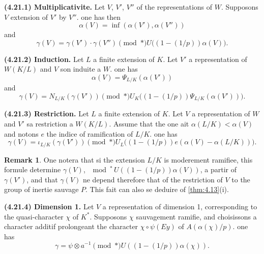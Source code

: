 \documentclass[12pt,a4paper]{article}
\theoremstyle{plain}
\theoremstyle{definition}
\newtheorem{remark}[theorem]{Remark}
\theoremstyle{remark}
\begin{document}
\textbf{(4.21.1) Multiplicativite.} Let $V$, $V'$, $V''$ of the representations of $W$. Supposons $V$ extension of $V'$ by $V''$. one has then
\[
\alpha(V) = \inf(\alpha(V'), \alpha(V''))
\]
and
\[
\gamma(V) = \gamma(V') \cdot \gamma(V'') \pmod{*} U\bigl((1-(1/p))\alpha(V)\bigr).
\]

\textbf{(4.21.2) Induction.} Let $L$ a finite extension of $K$. Let $V'$ a representation of $W(K/L)$ and $V$ son induite a $W$. one has
\[
\alpha(V) = \Psi_{L/K}(\alpha(V'))
\]
and
\[
\gamma(V) = N_{L/K}(\gamma(V')) \pmod{*} U_K\bigl((1-(1/p))\Psi_{L/K}(\alpha(V'))\bigr).
\]

\textbf{(4.21.3) Restriction.} Let $L$ a finite extension of $K$. Let $V$ a representation of $W$ and $V'$ sa restriction a $W(K/L)$. Assume that the one ait $\alpha(L/K) < \alpha(V)$ and notons $e$ the indice of ramification of $L/K$. one has
\[
\gamma(V) = \iota_{L/K}(\gamma(V')) \pmod{*} U_L\bigl((1-(1/p))e(\alpha(V) - \alpha(L/K))\bigr).
\]

\begin{remark}
One notera that si the extension $L/K$ is moderement ramifiee, this formule determine $\gamma(V)$, $\mod^*\, U((1-(1/p))\alpha(V))$, a partir of $\gamma(V')$, and that $\gamma(V)$ ne depend therefore that of the restriction of $V$ to the group of inertie sauvage $P$. This fait can also se deduire of \ref{thm:4.13}(i).
\end{remark}

\textbf{(4.21.4) Dimension 1.} Let $V$ a representation of dimension 1, corresponding to the quasi-character $\chi$ of $K^*$. Supposons $\chi$ sauvagement ramifie, and choisissons a character additif prolongeant the character $\chi \circ \psi(Ey)$ of $A(\alpha(\chi)/p)$. one has
\[
\gamma = \psi \otimes a^{-1} \pmod{*} U((1-(1/p))\alpha(\chi)).
\]

\subsection{}
\label{sec:4.22}
\end{document}
